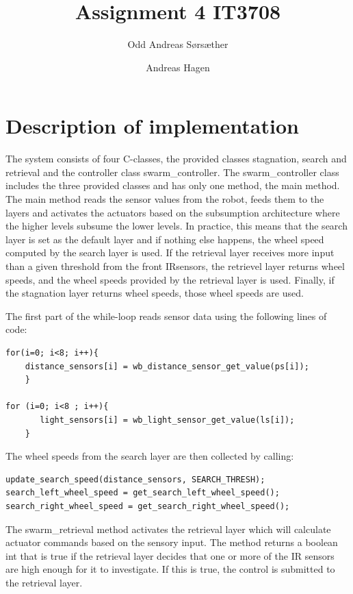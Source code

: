 \documentclass[titlepage,norsk,a4paper,10pt]{article}
\title{Assignment 4 IT3708}
\author{Odd Andreas Sørsæther \and Andreas Hagen}
\begin{document}
\maketitle


\section{Description of implementation}


The system consists of four C-classes, the provided classes stagnation, search and retrieval and the controller class swarm\_controller. The swarm\_controller class includes the three provided classes and has only one method, the main method. The main method reads the sensor values from the robot, feeds them to the layers and activates the actuators based on the subsumption architecture where the higher levels subsume the lower levels. In practice, this means that the search layer is set as the default layer and if nothing else happens, the wheel speed computed by the search layer is used. If the retrieval layer receives more input than a given threshold from the front IR\-sensors, the retrievel layer returns wheel speeds, and the wheel speeds provided by the retrieval layer is used. Finally, if the stagnation layer returns wheel speeds, those wheel speeds are used.

The  first part of the while-loop reads sensor data using the following lines of code:


\begin{verbatim}
for(i=0; i<8; i++){
	distance_sensors[i] = wb_distance_sensor_get_value(ps[i]);
	}

for (i=0; i<8 ; i++){
       light_sensors[i] = wb_light_sensor_get_value(ls[i]);
    }

\end{verbatim}

The wheel speeds from the search layer are then collected by calling:

\begin{verbatim}
update_search_speed(distance_sensors, SEARCH_THRESH);
search_left_wheel_speed = get_search_left_wheel_speed();
search_right_wheel_speed = get_search_right_wheel_speed();

\end{verbatim}


The swarm\_retrieval method activates the retrieval layer which will calculate actuator commands based on the sensory input. The method returns a boolean int that is true if the retrieval layer decides that one or more of the IR sensors  are high enough for it to investigate. If this is true, the control is submitted to the retrieval layer. 
\end{document}
